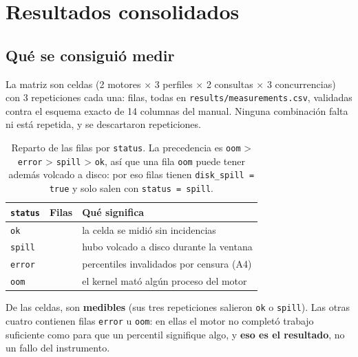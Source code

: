
\section{Resultados consolidados}
\label{sec:resultados}

\subsection{Qué se consiguió medir}

La matriz son \cifraCeldas{} celdas (2 motores $\times$ 3 perfiles $\times$ 2
consultas $\times$ 3 concurrencias) con 3 repeticiones cada una:
\cifraFilasCsv{} filas, todas en \texttt{results/measurements.csv}, validadas
contra el esquema exacto de 14 columnas del manual. Ninguna combinación falta ni
está repetida, y se descartaron \cifraDescartadas{} repeticiones.

\begin{table}[htbp]
  \centering
  \caption{Reparto de las \cifraFilasCsv{} filas por \texttt{status}. La
           precedencia es \texttt{oom} > \texttt{error} > \texttt{spill} >
           \texttt{ok}, así que una fila \texttt{oom} puede tener además volcado a
           disco: por eso \cifraFilasConSpill{} filas tienen
           \texttt{disk\_spill = true} y solo \cifraFilasSpill{} salen con
           \texttt{status = spill}.}
  \label{tab:estados}
  \small
  \begin{tabular}{lrl}
    \toprule
    \texttt{status} & Filas & Qué significa \\
    \midrule
    \texttt{ok}    & \cifraFilasOk{}    & la celda se midió sin incidencias \\
    \texttt{spill} & \cifraFilasSpill{} & hubo volcado a disco durante la ventana \\
    \texttt{error} & \cifraFilasError{} & percentiles invalidados por censura (A4) \\
    \texttt{oom}   & \cifraFilasOom{}   & el kernel mató algún proceso del motor \\
    \bottomrule
  \end{tabular}
\end{table}

De las \cifraCeldas{} celdas, \cifraCeldasMedibles{} son \textbf{medibles} (sus
tres repeticiones salieron \texttt{ok} o \texttt{spill}). Las otras cuatro
contienen filas \texttt{error} u \texttt{oom}: en ellas el motor no completó
trabajo suficiente como para que un percentil signifique algo, y
\textbf{eso es el resultado}, no un fallo del instrumento.

